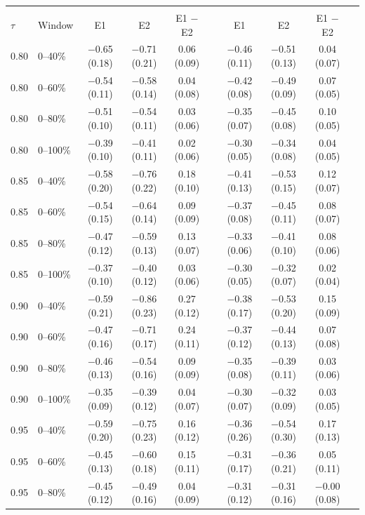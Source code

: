 \begin{table}[t]
{\begin{tabular}{llcccccccc}
\addlinespace\multicolumn{10}{l}{\emph{B. Local conditional quantile $Q_\tau(m\mid g)$, linear quantile regression (descriptive): E1, E2 and E1 $-$ E2}}\\
 $\tau$ & Window & E1 & E2 & E1 $-$ E2 & & E1 & E2 & E1 $-$ E2 & \\
0.80 & 0--40\% & $-$0.65 (0.18) & $-$0.71 (0.21) & 0.06 (0.09) & & $-$0.46 (0.11) & $-$0.51 (0.13) & 0.04 (0.07) & \\
0.80 & 0--60\% & $-$0.54 (0.11) & $-$0.58 (0.14) & 0.04 (0.08) & & $-$0.42 (0.08) & $-$0.49 (0.09) & 0.07 (0.05) & \\
0.80 & 0--80\% & $-$0.51 (0.10) & $-$0.54 (0.11) & 0.03 (0.06) & & $-$0.35 (0.07) & $-$0.45 (0.08) & 0.10 (0.05) & \\
0.80 & 0--100\% & $-$0.39 (0.10) & $-$0.41 (0.11) & 0.02 (0.06) & & $-$0.30 (0.05) & $-$0.34 (0.08) & 0.04 (0.05) & \\
0.85 & 0--40\% & $-$0.58 (0.20) & $-$0.76 (0.22) & 0.18 (0.10) & & $-$0.41 (0.13) & $-$0.53 (0.15) & 0.12 (0.07) & \\
0.85 & 0--60\% & $-$0.54 (0.15) & $-$0.64 (0.14) & 0.09 (0.09) & & $-$0.37 (0.08) & $-$0.45 (0.11) & 0.08 (0.07) & \\
0.85 & 0--80\% & $-$0.47 (0.12) & $-$0.59 (0.13) & 0.13 (0.07) & & $-$0.33 (0.06) & $-$0.41 (0.10) & 0.08 (0.06) & \\
0.85 & 0--100\% & $-$0.37 (0.10) & $-$0.40 (0.12) & 0.03 (0.06) & & $-$0.30 (0.05) & $-$0.32 (0.07) & 0.02 (0.04) & \\
0.90 & 0--40\% & $-$0.59 (0.21) & $-$0.86 (0.23) & 0.27 (0.12) & & $-$0.38 (0.17) & $-$0.53 (0.20) & 0.15 (0.09) & \\
0.90 & 0--60\% & $-$0.47 (0.16) & $-$0.71 (0.17) & 0.24 (0.11) & & $-$0.37 (0.12) & $-$0.44 (0.13) & 0.07 (0.08) & \\
0.90 & 0--80\% & $-$0.46 (0.13) & $-$0.54 (0.16) & 0.09 (0.09) & & $-$0.35 (0.08) & $-$0.39 (0.11) & 0.03 (0.06) & \\
0.90 & 0--100\% & $-$0.35 (0.09) & $-$0.39 (0.12) & 0.04 (0.07) & & $-$0.30 (0.07) & $-$0.32 (0.09) & 0.03 (0.05) & \\
0.95 & 0--40\% & $-$0.59 (0.20) & $-$0.75 (0.23) & 0.16 (0.12) & & $-$0.36 (0.26) & $-$0.54 (0.30) & 0.17 (0.13) & \\
0.95 & 0--60\% & $-$0.45 (0.13) & $-$0.60 (0.18) & 0.15 (0.11) & & $-$0.31 (0.17) & $-$0.36 (0.21) & 0.05 (0.11) & \\
0.95 & 0--80\% & $-$0.45 (0.12) & $-$0.49 (0.16) & 0.04 (0.09) & & $-$0.31 (0.12) & $-$0.31 (0.16) & $-$0.00 (0.08) & \\

\end{tabular}}
\end{table}
